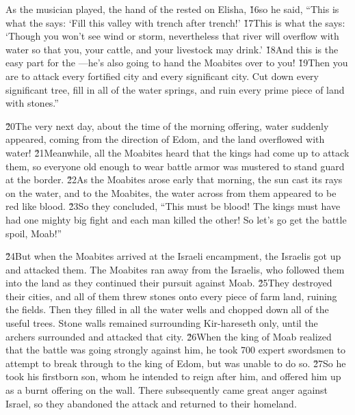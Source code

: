 As the musician played, the hand of the  rested on Elisha, \v{16}so he said, ``This is what the  says: `Fill this valley with trench after trench!' \v{17}This is what the  says: `Though you won't see wind or storm, nevertheless that river will overflow with water so that you, your cattle, and your livestock may drink.' \v{18}And this is the easy part for the ---he's also going to hand the Moabites over to you! \v{19}Then you are to attack every fortified city and every significant city. Cut down every significant tree, fill in all of the water springs, and ruin every prime piece of land with stones.''

\v{20}The very next day, about the time of the morning offering, water suddenly appeared, coming from the direction of Edom, and the land overflowed with water! \v{21}Meanwhile, all the Moabites heard that the kings had come up to attack them, so everyone old enough to wear battle armor was mustered to stand guard at the border. \v{22}As the Moabites arose early that morning, the sun cast its rays on the water, and to the Moabites, the water across from them appeared to be red like blood. \v{23}So they concluded, ``This must be blood! The kings must have had one mighty big fight and each man killed the other! So let's go get the battle spoil, Moab!''

\v{24}But when the Moabites arrived at the Israeli encampment, the Israelis got up and attacked them. The Moabites ran away from the Israelis, who followed them into the land as they continued their pursuit against Moab. \v{25}They destroyed their cities, and all of them threw stones onto every piece of farm land, ruining the fields. Then they filled in all the water wells and chopped down all of the useful trees. Stone walls remained surrounding Kir-hareseth only, until the archers surrounded and attacked that city. \v{26}When the king of Moab realized that the battle was going strongly against him, he took 700 expert swordsmen to attempt to break through to the king of Edom, but was unable to do so. \v{27}So he took his firstborn son, whom he intended to reign after him, and offered him up as a burnt offering on the wall. There subsequently came great anger against Israel, so they abandoned the attack and returned to their homeland.

